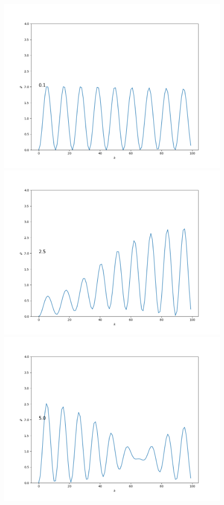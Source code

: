 \documentclass[11pt,a4paper]{article}
\begin{document}
\begin{figure}[ht!]
    \centering
    \begin{multicols}{3}
        \includegraphics[width=\linewidth]{../figures/frame_n=9_time=0.1.png}
        \includegraphics[width=\linewidth]{../figures/frame_n=9_time=2.5.png}
        \includegraphics[width=\linewidth]{../figures/frame_n=9_time=5.0.png}

\end{multicols}
\end{figure}
\end{document}

